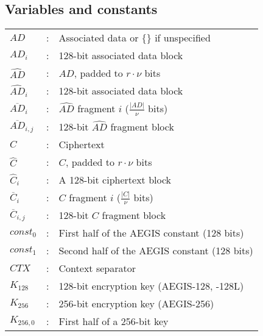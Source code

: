 \documentclass[envcountsame,runningheads,notitlepage]{llncs}
\begin{document}
\subsection{Variables and constants}

\begin{tabular}{l c p{}}
  $AD$                  & : & Associated data or $\{\}$ if unspecified                        \\
  $AD_i$                & : & 128-bit associated data block                                   \\
  $\hat{AD}$            & : & $AD$, padded to $r \cdot \nu$ bits                              \\
  $\hat{AD}_i$          & : & 128-bit associated data block                                   \\
  $\overline{AD}_i$     & : & $\hat{AD}$ fragment $i$ ($\frac{\lvert AD \rvert}{\nu}$ bits)   \\
  $\overline{AD}_{i,j}$ & : & 128-bit $\hat{AD}$ fragment block                               \\
  $C$                   & : & Ciphertext                                                      \\
  $\hat{C}$             & : & $C$, padded to $r \cdot \nu$ bits                               \\
  $\hat{C}_i$           & : & A 128-bit ciphertext block                                      \\
  $\overline{C}_i$      & : & $C$ fragment $i$ ($\frac{\lvert C \rvert}{\nu}$ bits)           \\
  $\overline{C}_{i,j}$  & : & 128-bit $C$ fragment block                                      \\
  $const_0$             & : & First half of the AEGIS constant (128 bits)                     \\
  $const_1$             & : & Second half of the AEGIS constant (128 bits)                    \\
  $CTX$                 & : & Context separator                                               \\
  $K_{128}$             & : & 128-bit encryption key (AEGIS-128, -128L)                       \\
  $K_{256}$             & : & 256-bit encryption key (AEGIS-256)                              \\
  $K_{256,0}$           & : & First half of a 256-bit key                                     \\

\end{tabular}
\end{document}
